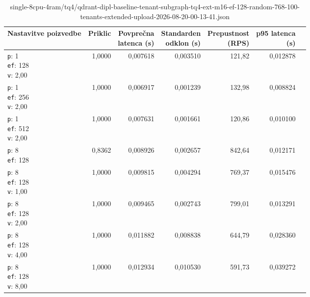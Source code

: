\begin{table}[htbp]
  \centering
\small
  \caption{single-8cpu-4ram/tq4/qdrant-dipl-baseline-tenant-subgraph-tq4-ext-m16-ef-128-random-768-100-tenants-extended-upload-2026-08-20-00-13-41.json}
  \label{tab:single-8cpu-4ram:tq4:qdrant-dipl-baseline-tenant-subgraph-tq4-ext-m16-ef-128-random-768-100-tenants-extended-upload-2026-08-20-00-13-41.json}
  \begin{tabularx}{\textwidth}{Xrrrrrr}
    \toprule
    Nastavitve poizvedbe & Priklic & \makecell{Povprečna\\latenca (s)} & \makecell{Standarden\\odklon (s)} & \makecell{Prepustnost\\(RPS)} & \makecell{p95 latenca\\(s)}  \\
    \midrule
    \makecell{\texttt{p}: 1\\\texttt{ef}: 128\\\texttt{v}: 2,00} & 1,0000 & 0,007618 & 0,003510 & 121,82 & 0,012878 \\
    \makecell{\texttt{p}: 1\\\texttt{ef}: 256\\\texttt{v}: 2,00} & 1,0000 & 0,006917 & 0,001239 & 132,98 & 0,008824 \\
    \makecell{\texttt{p}: 1\\\texttt{ef}: 512\\\texttt{v}: 2,00} & 1,0000 & 0,007631 & 0,001661 & 120,86 & 0,010100 \\
    \makecell{\texttt{p}: 8\\\texttt{ef}: 128} & 0,8362 & 0,008926 & 0,002657 & 842,64 & 0,012171 \\
    \makecell{\texttt{p}: 8\\\texttt{ef}: 128\\\texttt{v}: 1,00} & 1,0000 & 0,009815 & 0,004294 & 769,37 & 0,015476 \\
    \makecell{\texttt{p}: 8\\\texttt{ef}: 128\\\texttt{v}: 2,00} & 1,0000 & 0,009465 & 0,002743 & 799,01 & 0,013291 \\
    \makecell{\texttt{p}: 8\\\texttt{ef}: 128\\\texttt{v}: 4,00} & 1,0000 & 0,011882 & 0,008838 & 644,79 & 0,028360 \\
    \makecell{\texttt{p}: 8\\\texttt{ef}: 128\\\texttt{v}: 8,00} & 1,0000 & 0,012934 & 0,010530 & 591,73 & 0,039272 \\

\end{tabularx}
\end{table}
